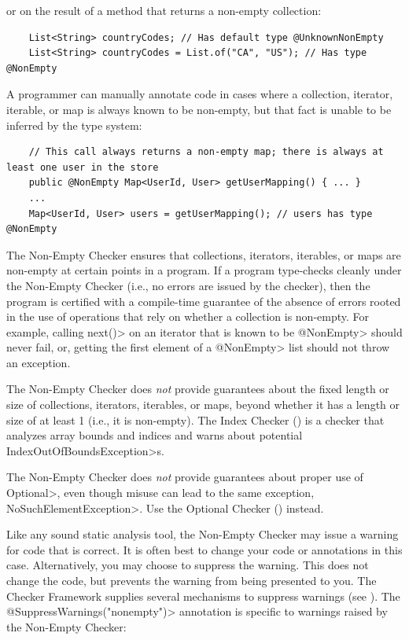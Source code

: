 \noindent
or on the result of a method that returns a non-empty collection:

\begin{Verbatim}
    List<String> countryCodes; // Has default type @UnknownNonEmpty
    List<String> countryCodes = List.of("CA", "US"); // Has type @NonEmpty
\end{Verbatim}

A programmer can manually annotate code in cases where a collection,
iterator, iterable, or map is always known to be non-empty, but that fact is
unable to be inferred by the type system:

\begin{Verbatim}
    // This call always returns a non-empty map; there is always at least one user in the store
    public @NonEmpty Map<UserId, User> getUserMapping() { ... }
    ...
    Map<UserId, User> users = getUserMapping(); // users has type @NonEmpty
\end{Verbatim}


The Non-Empty Checker ensures that collections, iterators, iterables, or maps
are non-empty at certain points in a program.
If a program type-checks cleanly under the Non-Empty Checker (i.e., no errors
are issued by the checker), then the program is certified with a compile-time
guarantee of the absence of errors rooted in the use of operations that
rely on whether a collection is non-empty.
For example, calling \<next()> on an iterator that is known to be \<@NonEmpty>
should never fail, or, getting the first element of a \<@NonEmpty> list should
not throw an exception.

The Non-Empty Checker does \emph{not} provide guarantees about the fixed
length or size of collections, iterators, iterables, or maps, beyond whether
it has a length or size of at least 1 (i.e., it is non-empty).
The Index Checker () is a checker that analyzes
array bounds and indices and warns about potential
\<IndexOutOfBoundsException>s.

The Non-Empty Checker does \emph{not} provide guarantees about proper use
of \<Optional>, even though misuse can lead to the same exception,
\<NoSuchElementException>.  Use the Optional Checker
() instead.



Like any sound static analysis tool, the Non-Empty Checker may issue a warning
for code that is correct.
It is often best to change your code or annotations in this case.
Alternatively, you may choose to suppress the warning.
This does not change the code, but prevents the warning from being presented to
you.
The Checker Framework supplies several mechanisms to suppress warnings (see
).
The \<@SuppressWarnings("nonempty")> annotation is specific to warnings raised
by the Non-Empty Checker:

